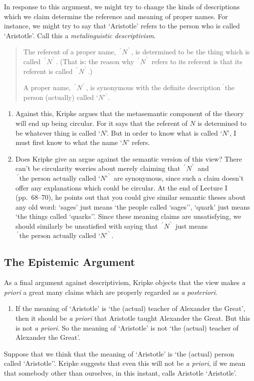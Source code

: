 \documentclass[landscape, two column, full page,reqno]{article}
\newcommand{\qd}{\begin{quote}\begin{description}  [align=left,style=nextline,leftmargin=*,labelsep=0pt,font=\normalfont]}
\newcommand{\zd}{\end{description}\end{quote}}
\newcommand{\qe}{\begin{enumerate}[align=left,style=nextline,leftmargin=17pt,labelsep=5pt,font=\normalfont]}
\newcommand{\ze}{\end{enumerate}}
\newcommand{\p}{\item}
\newcommand{\e}{\emph}
\newcommand{\s}{\textsc}
\newcommand{\qq}[1]{ ~\!^\ulcorner #1  ^\urcorner~\!}
\begin{document}
\p In response to this argument, we might try to change the kinds of descriptions which we claim determine the reference and meaning of proper names.  For instance, we might try to say that `Aristotle' refers to the person who is called `Aristotle'.  Call this a \e{metalinguistic descriptivism}.
	\qd
	\p[\s{Metasemantic Metalinguistic Descriptivism}] The referent of a proper name, $\qq{N}$, is determined to be the thing which is called $\qq{N}$.  (That is: the reason why $\qq{N}$ refers to its referent is that its referent is called $\qq{N}$.)
	\p[\s{Semantic Metalinguistic Descriptivism}] A proper name, $\qq{N}$, is synonymous with the definite description $^\ulcorner$the person (actually) called `$N$'$^\urcorner$.
	\zd
	\qe
	\p Against this, Kripke argues that the metasemantic component of the theory will end up being circular.  For it says that the referent of $N$ is determined to be whatever thing is called `$N$'.  But in order to know what is called `$N$', I must first know to what the name `$N$' refers.
	\p Does Kripke give an argue against the semantic version of this view?  There can't be circularity worries about merely claiming that $\qq{N}$ and $\qq{\text{the person actually called `}N\text{'}}$ are synonymous, since such a claim doesn't offer any explanations which could be circular.  At the end of Lecture I (pp.~68--70), he points out that you could give similar semantic theses about any old word: `sages' just means `the people called `sages'', `quark' just means `the things called `quarks''.  Since these meaning claims are unsatisfying, we should similarly be unsatisfied with saying that $\qq{N}$ just means $\qq{\text{the person actually called `}N\text{'}}$.
	\ze 
\subsection{The Epistemic Argument}

\p As a final argument against descriptivism, Kripke objects that the view makes \e{a priori} a great many claims which are properly regarded as \e{a posteriori}.
	\qe
	\p If the meaning of `Aristotle' is `the (actual) teacher of Alexander the Great', then it should be \e{a priori} that Aristotle taught Alexander the Great.  But this is not \e{a priori}.  So the meaning of `Aristotle' is not `the (actual) teacher of Alexander the Great'.
	\ze 
\p Suppose that we think that the meaning of `Aristotle' is `the (actual) person called `Aristotle''.  Kripke suggests that even this will not be \e{a priori}, if we mean that somebody other than ourselves, in this instant, calls Aristotle `Aristotle'.
\end{document}
